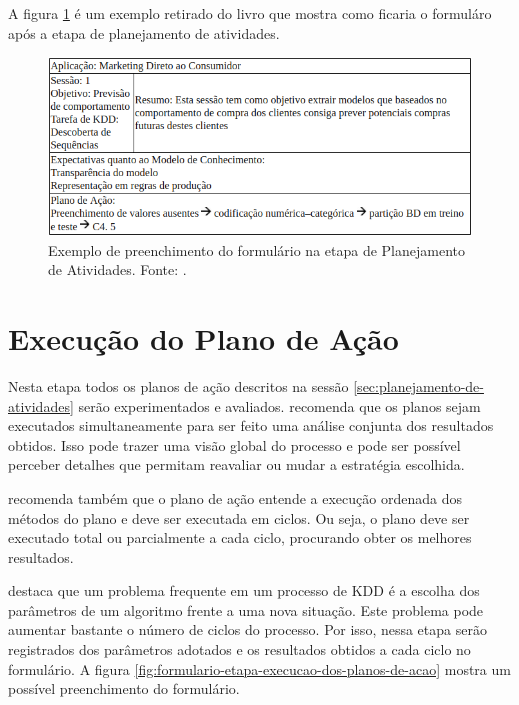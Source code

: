 \documentclass[diss,capa]{texufpel}
\begin{document}
    A figura \ref{fig:formulario-etapa-planejamento-atividades} é um exemplo retirado do livro que mostra como ficaria o formuláro após a etapa de planejamento de atividades.
    
    \begin{figure}[htbp]
      \centering \includegraphics[scale=.4]{imagens/formulario-etapa-planejamento-atividades.png}
      \caption{Exemplo de preenchimento do formulário na etapa de Planejamento de Atividades. Fonte: \cite{goldschmidt2015data}.}
      \label{fig:formulario-etapa-planejamento-atividades}
    \end{figure}
    
    \section{Execução do Plano de Ação}
    \label{sec:execucao-do-plano-de-acao}
    
    Nesta etapa todos os planos de ação descritos na sessão \ref{sec:planejamento-de-atividades} serão experimentados e avaliados. \citet{goldschmidt2015data} recomenda que os planos sejam executados simultaneamente para ser feito uma análise conjunta dos resultados obtidos. Isso pode trazer uma visão global do processo e pode ser possível perceber detalhes que permitam reavaliar ou mudar a estratégia escolhida.
    
    \citet{goldschmidt2015data} recomenda também que o plano de ação entende a execução ordenada dos métodos do plano e deve ser executada em ciclos. Ou seja, o plano deve ser executado total ou parcialmente a cada ciclo, procurando obter os melhores resultados.
    
    \citet{goldschmidt2015data} destaca que um problema frequente em um processo de KDD é a escolha dos parâmetros de um algoritmo frente a uma nova situação. Este problema pode aumentar bastante o número de ciclos do processo. Por isso, nessa etapa serão registrados dos parâmetros adotados e os resultados obtidos a cada ciclo no formulário. A figura \ref{fig:formulario-etapa-execucao-dos-planos-de-acao} mostra um possível preenchimento do formulário.
    
\end{document}
